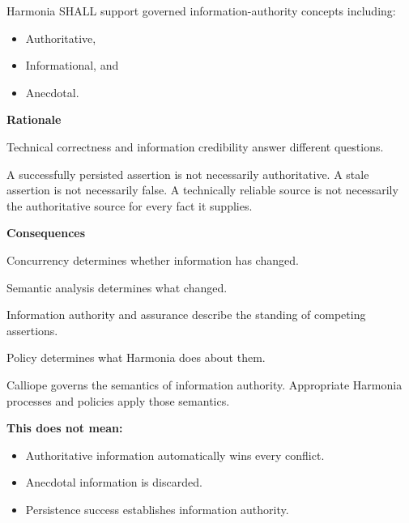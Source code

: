 Harmonia SHALL support governed information-authority concepts including:



\begin{itemize}


\item Authoritative,

\item Informational, and

\item Anecdotal.

\end{itemize}


\par\medskip\textbf{Rationale}\par


Technical correctness and information credibility answer different
questions.



A successfully persisted assertion is not necessarily authoritative. A
stale assertion is not necessarily false. A technically reliable source
is not necessarily the authoritative source for every fact it supplies.



\par\medskip\textbf{Consequences}\par


Concurrency determines whether information has changed.



Semantic analysis determines what changed.



Information authority and assurance describe the standing of competing
assertions.



Policy determines what Harmonia does about them.



Calliope governs the semantics of information authority. Appropriate
Harmonia processes and policies apply those semantics.



\textbf{This does not mean:}



\begin{itemize}


\item Authoritative information automatically wins every conflict.

\item Anecdotal information is discarded.

\item Persistence success establishes information authority.

\end{itemize}

